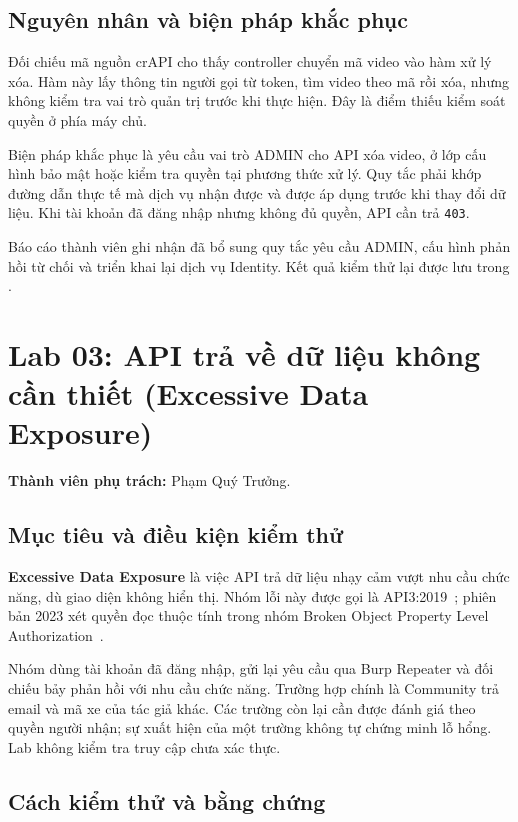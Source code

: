 \documentclass[oneside,a4paper,12pt]{extreport}
\begin{document}
\clearpage
\subsection{Nguyên nhân và biện pháp khắc phục}

Đối chiếu mã nguồn crAPI cho thấy controller chuyển mã video vào hàm
xử lý xóa. Hàm này lấy thông tin người gọi từ token, tìm video theo mã
rồi xóa, nhưng không kiểm tra vai trò quản trị trước khi thực hiện.
Đây là điểm thiếu kiểm soát quyền ở phía máy chủ.

Biện pháp khắc phục là yêu cầu vai trò ADMIN cho API xóa video, ở lớp
cấu hình bảo mật hoặc kiểm tra quyền tại phương thức xử lý. Quy tắc
phải khớp đường dẫn thực tế mà dịch vụ nhận được và được áp dụng trước
khi thay đổi dữ liệu. Khi tài khoản đã đăng nhập nhưng không đủ quyền,
API cần trả \texttt{403}.

Báo cáo thành viên ghi nhận đã bổ sung quy tắc yêu cầu ADMIN, cấu hình
phản hồi từ chối và triển khai lại dịch vụ Identity. Kết quả kiểm thử
lại được lưu trong .

\clearpage
\section{Lab 03: API trả về dữ liệu không cần thiết (Excessive Data Exposure)}
\label{chap:lab03}

\noindent\textbf{Thành viên phụ trách:} Phạm Quý Trưởng.

\subsection{Mục tiêu và điều kiện kiểm thử}

\textbf{Excessive Data Exposure} là việc API trả dữ liệu nhạy cảm
vượt nhu cầu chức năng, dù giao diện không hiển thị. Nhóm lỗi này
được gọi là API3:2019~\cite{owasp-exposure}; phiên bản 2023 xét quyền
đọc thuộc tính trong nhóm Broken Object Property Level
Authorization~\cite{owasp-property}.

Nhóm dùng tài khoản đã đăng nhập, gửi lại yêu cầu qua Burp Repeater
và đối chiếu bảy phản hồi với nhu cầu chức năng. Trường hợp chính là
Community trả email và mã xe của tác giả khác. Các trường còn lại
cần được đánh giá theo quyền người nhận; sự xuất hiện của một trường
không tự chứng minh lỗ hổng. Lab không kiểm tra truy cập chưa xác thực.

\subsection{Cách kiểm thử và bằng chứng}
\end{document}
